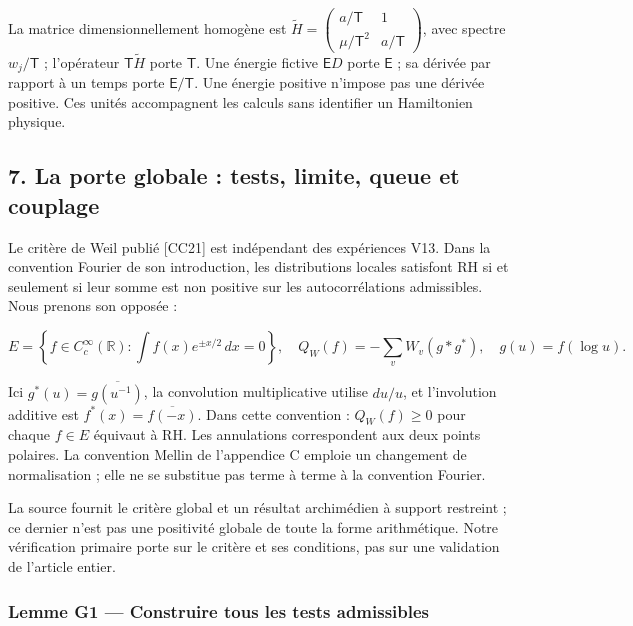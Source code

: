 \documentclass[
  10pt,
  a4paper,
]{article}
\begin{document}
La matrice dimensionnellement homogène est
\(\widetilde H=\begin{pmatrix}a/\mathsf T&1\\\mu/\mathsf T^2&a/\mathsf T\end{pmatrix}\),
avec spectre \(w_j/\mathsf T\) ; l'opérateur \(\mathsf T\widetilde H\)
porte \(\mathsf T\). Une énergie fictive \(\mathsf E D\) porte
\(\mathsf E\) ; sa dérivée par rapport à un temps porte
\(\mathsf E/\mathsf T\). Une énergie positive n'impose pas une dérivée
positive. Ces unités accompagnent les calculs sans identifier un
Hamiltonien physique.

\newpage

\hypertarget{la-porte-globale-tests-limite-queue-et-couplage}{%
\subsection{7. La porte globale : tests, limite, queue et
couplage}\label{la-porte-globale-tests-limite-queue-et-couplage}}

Le critère de Weil publié {[}CC21{]} est indépendant des expériences
V13. Dans la convention Fourier de son introduction, les distributions
locales satisfont RH si et seulement si leur somme est non positive sur
les autocorrélations admissibles. Nous prenons son opposée :

\[
E=\left\{f\in C_c^\infty(\mathbb R):\int f(x)e^{\pm x/2}\,dx=0\right\},
\quad Q_W(f)=-\sum_vW_v(g*g^*),\quad g(u)=f(\log u).
\]

Ici \(g^*(u)=\overline{g(u^{-1})}\), la convolution multiplicative
utilise \(du/u\), et l'involution additive est
\(f^*(x)=\overline{f(-x)}\). Dans cette convention : \(Q_W(f)\ge0\) pour
chaque \(f\in E\) équivaut à RH. Les annulations correspondent aux deux
points polaires. La convention Mellin de l'appendice C emploie un
changement de normalisation ; elle ne se substitue pas terme à terme à
la convention Fourier.

La source fournit le critère global et un résultat archimédien à support
restreint ; ce dernier n'est pas une positivité globale de toute la
forme arithmétique. Notre vérification primaire porte sur le critère et
ses conditions, pas sur une validation de l'article entier.

\hypertarget{lemme-g1-construire-tous-les-tests-admissibles}{%
\subsubsection{Lemme G1 --- Construire tous les tests
admissibles}\label{lemme-g1-construire-tous-les-tests-admissibles}}
\end{document}
